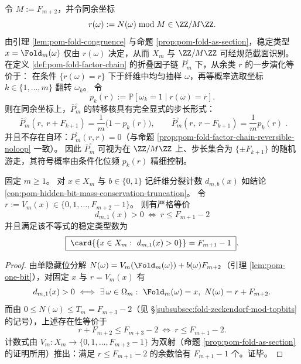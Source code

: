 \begin{conclusion}\label{con:pom-fold-factor-chain-explicit-kernel}
令 \(M:=F_{m+2}\)，并令同余坐标
\[
r(\omega):=N(\omega)\bmod M\in\ZZ/M\ZZ.
\]
由引理 \ref{lem:pom-fold-congruence} 与命题 \ref{prop:pom-fold-as-section}，稳定类型 \(x=\Fold_m(\omega)\) 仅由 \(r(\omega)\) 决定，从而 \(X_m\) 与 \(\ZZ/M\ZZ\) 可经规范截面识别。
在定义 \ref{def:pom-fold-factor-chain} 的折叠因子链 \(\overline P_m^{\square}\) 下，从余类 \(r\) 的一步演化等价于：
在条件 \(\{r(\omega)=r\}\) 下于纤维中均匀抽样 \(\omega\)，再等概率选取坐标 \(k\in\{1,\dots,m\}\) 翻转 \(\omega_k\)。
令
\[
p_k(r):=\mathbb P[\omega_k=1\mid r(\omega)=r].
\]
则在同余坐标上，\(\overline P_m^{\square}\) 的转移核具有完全显式的步长形式：
\[
\boxed{\;
\overline P_m^{\square}(r,\ r+F_{k+1})=\frac{1}{m}\bigl(1-p_k(r)\bigr),\qquad
\overline P_m^{\square}(r,\ r-F_{k+1})=\frac{1}{m}p_k(r)\; }.
\]
并且不存在自环：\(\overline P_m^{\square}(r,r)=0\)（与命题 \ref{prop:pom-fold-factor-chain-reversible-noloop} 一致）。
因此 \(\overline P_m^{\square}\) 可视为在 \(\ZZ/M\ZZ\) 上、步长集合为 \(\{\pm F_{k+1}\}\) 的随机游走，其符号概率由条件化位频 \(p_k(r)\) 精细控制。
\end{conclusion}

\begin{proposition}[隐藏位上层支撑的阈值律与可行类型计数]\label{prop:pom-hiddenbit-upper-support-threshold}
固定 \(m\ge 1\)。
对 \(x\in X_m\) 与 \(b\in\{0,1\}\) 记纤维分裂计数 \(d_{m,b}(x)\) 如结论 \ref{con:pom-hidden-bit-mass-conservation-truncation}。
令 \(r:=V_m(x)\in\{0,1,\dots,F_{m+2}-1\}\)。
则有严格等价
\[
\boxed{\;
d_{m,1}(x)>0\ \Longleftrightarrow\ r\le F_{m+1}-2\;}
\]
并且满足该不等式的稳定类型数为
\[
\boxed{\;
\card{\{x\in X_m:\ d_{m,1}(x)>0\}}=F_{m+1}-1\; }.
\]
\end{proposition}
\begin{proof}
由单隐藏位分解 \(N(\omega)=V_m(\Fold_m(\omega))+b(\omega)F_{m+2}\)（引理 \ref{lem:pom-one-bit}），对固定 \(x\) 与 \(r=V_m(x)\) 有
\[
d_{m,1}(x)>0\ \Longleftrightarrow\ \exists\,\omega\in\Omega_m:\ \Fold_m(\omega)=x,\ N(\omega)=r+F_{m+2}.
\]
而由 \(0\le N(\omega)\le T_m=F_{m+3}-2\)（见 \S\ref{subsubsec:fold-zeckendorf-mod-topbits} 的记号），上述存在性等价于
\[
r+F_{m+2}\le F_{m+3}-2\ \Longleftrightarrow\ r\le F_{m+1}-2.
\]
计数式由 \(V_m:X_m\to\{0,1,\dots,F_{m+2}-1\}\) 为双射（命题 \ref{prop:pom-fold-as-section} 的证明所用）推出：满足 \(r\le F_{m+1}-2\) 的余数恰有 \(F_{m+1}-1\) 个。证毕。
\end{proof}


